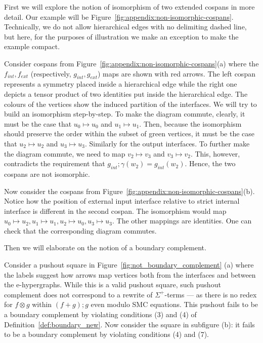 First we will explore the notion of isomorphism of two extended cospans in more detail.
Our example will be Figure~\ref{fig:appendix:non-isomorphic-cospans}.
Technically, we do not allow hierarchical edges with no delimiting dashed line, but here, for the purposes of illustration we make an exception to make the example compact.
\begin{example}
    Consider cospans from Figure~\ref{fig:appendix:non-isomorphic-cospans}(a) where the $f_{int}, f_{ext}$ (respectively, $g_{int},g_{ext}$) maps are shown with red arrows.
    The left cospan represents a symmetry placed inside a hierarchical edge while the right one depicts a tensor product of two identities put inside the hierarchical edge.
    The colours of the vertices show the induced partition of the interfaces.
    We will try to build an isomorphism step-by-step.
    To make the diagram commute, clearly, it must be the case that $u_0 \mapsto u_0$ and $u_1 \mapsto u_1$.
    Then, because the isomorphism should preserve the order within the subset of green vertices, it must be the case that $u_2 \mapsto u_2$ and $u_3 \mapsto u_3$.
    Similarly for the output interfaces.
    To further make the diagram commute, we need to map $v_2 \mapsto v_3$ and $v_3 \mapsto v_2$.
    This, however, contradicts the requirement that $g_{int};\gamma(w_2) = g_{int}(w_2)$.
    Hence, the two cospans are not isomorphic.
\end{example}

\begin{example}
    Now consider the cospans from Figure~\ref{fig:appendix:non-isomorphic-cospans}(b).
    Notice how the position of external input interface relative to strict internal interface is different in the second cospan.
    The isomorphism would map $u_0 \mapsto u_2, u_1 \mapsto u_1, u_2 \mapsto u_0, u_3 \mapsto u_3$.
    The other mappings are identities. 
    One can check that the corresponding diagram commutes.
\end{example}

Then we will elaborate on the notion of a boundary complement.

\begin{example}

Consider a pushout square in Figure~\ref{fig:not_boundary_complement} (a) where the labels suggest how arrows map vertices both from the interfaces and between the e-hypergraphs.
While this is a valid pushout square, such pushout complement does not correspond to a rewrite of $\Sigma^{+}$-terms --- as there is no redex for $f \otimes g$ within $(f + g);g$ even modulo SMC equations.
This pushout fails to be a boundary complement by violating conditions (3) and (4) of Definition~\ref{def:boundary_new}.
Now consider the square in subfigure (b): it fails to be a boundary complement by violating conditions (4) and (7).
\end{example}

